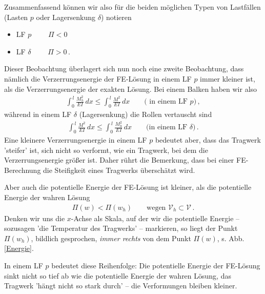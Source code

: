 {{Zusammenfassend k\"{o}nnen wir also f\"{u}r die beiden m\"{o}glichen Typen von Lastf\"{a}llen (Lasten $p$ oder Lagersenkung $\delta$) notieren\\

\begin{itemize}

\item {LF $p$ $\qquad \Pi < 0$} 

\item {LF $\delta$ $\qquad \Pi > 0$}\,. 

\end{itemize}

Dieser Beobachtung \"{u}berlagert sich nun noch eine zweite Beobachtung, dass n\"{a}mlich
die Verzerrungsenergie der FE-L\"{o}sung in einem LF $p$ immer kleiner ist, als die
Verzerrungsenergie der exakten L\"{o}sung. Bei einem Balken haben wir also
\begin{align}
\int_0^{\,l} \frac{M_h^2}{EI}\,dx \leq \int_0^{\,l} \frac{M^2}{EI}\,dx \qquad \mbox{( in
einem LF $p$)}\,,
\end{align}
w\"{a}hrend in einem LF $\delta$ (Lagersenkung) die Rollen vertauscht sind
\begin{align}
\int_0^{\,l} \frac{M^2}{EI}\,dx \leq \int_0^{\,l} \frac{M_h^2}{EI}\,dx \qquad \mbox{(in
einem LF $\delta$)}\,.
\end{align}
Eine kleinere Verzerrungsenergie in einem LF $p$ bedeutet aber, dass das Tragwerk 'steifer'
ist, sich nicht so verformt, wie ein Tragwerk, bei dem die Verzerrungsenergie gr\"{o}{\ss}er
ist. Daher r\"{u}hrt die Bemerkung, dass bei einer FE-Berechnung die Steifigkeit eines
Tragwerks \"{u}bersch\"{a}tzt wird.

Aber auch die potentielle Energie der FE-L\"{o}sung ist kleiner, als die potentielle Energie
der wahren L\"{o}sung
\begin{align}
 \Pi(w) < \Pi(w_{h}) \qquad \mbox{wegen}
\,\, \mathcal{V}_{h} \subset \mathcal{V} \,.
\end{align}
Denken wir uns die $x$-Achse als Skala, auf der wir die potentielle Energie -- sozusagen
'die Temperatur des Tragwerks' -- markieren, so liegt der Punkt $\Pi(w_h)$,
bildlich gesprochen, {\em immer rechts} von dem Punkt $\Pi(w)$, s. Abb. \ref{Energie}.

In einem LF $p$ bedeutet diese Reihenfolge: Die potentielle Energie der FE-L\"{o}sung sinkt
nicht so tief ab wie die potentielle Energie der wahren L\"{o}sung, das Tragwerk 'h\"{a}ngt
nicht so stark durch' -- die Verformungen bleiben kleiner.

}}
